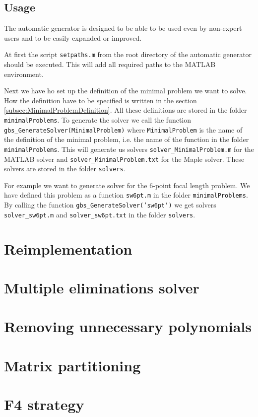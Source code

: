 \subsection{Usage}
The automatic generator is designed to be able to be used even by non-expert users and to be easily expanded or improved.

At first the script \texttt{setpaths.m} from the root directory of the automatic generator should be executed. This will add all required paths to the MATLAB environment.

Next we have ho set up the definition of the minimal problem we want to solve. How the definition have to be specified is written in the section \ref{subsec:MinimalProblemDefinition}. All these definitions are stored in the folder \texttt{minimalProblems}. To generate the solver we call the function \texttt{gbs\_GenerateSolver(MinimalProblem)} where \texttt{MinimalProblem} is the name of the definition of the minimal problem, i.e. the name of the function in the folder \texttt{minimalProblems}. This will generate us solvers \texttt{solver\_MinimalProblem.m} for the MATLAB solver and \texttt{solver\_MinimalProblem.txt} for the Maple solver. These solvers are stored in the folder \texttt{solvers}.

For example we want to generate solver for the 6-point focal length problem. We have defined this problem as a function \texttt{sw6pt.m} in the folder \texttt{minimalProblems}. By calling the function \texttt{gbs\_GenerateSolver('sw6pt')} we get solvers \texttt{solver\_sw6pt.m} and \texttt{solver\_sw6pt.txt} in the folder \texttt{solvers}.

\section{Reimplementation}

\section{Multiple eliminations solver}

\section{Removing unnecessary polynomials}

\section{Matrix partitioning}

\section{F4 strategy}
